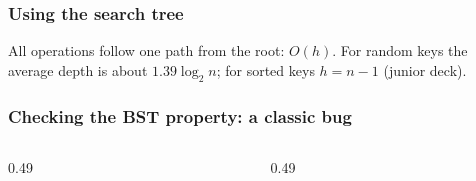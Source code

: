 \documentclass[aspectratio=169,10pt,compress]{beamer}
\begin{document}
\begin{frame}[t,fragile] \frametitle{Using the search tree}

  \vspace{0.2em}
  \small All operations follow one path from the root: $O(h)$. For random keys the average depth is about $1.39 \log_{2} n$; for sorted keys $h = n - 1$ (junior deck).
\end{frame}




\begin{frame}[t,fragile] \frametitle{Checking the BST property: a classic bug}
  \begin{columns}[T]
    \begin{column}{0.49\textwidth}
    \end{column}
    \begin{column}{0.49\textwidth}
    \end{column}
  \end{columns}
\end{frame}
\end{document}
